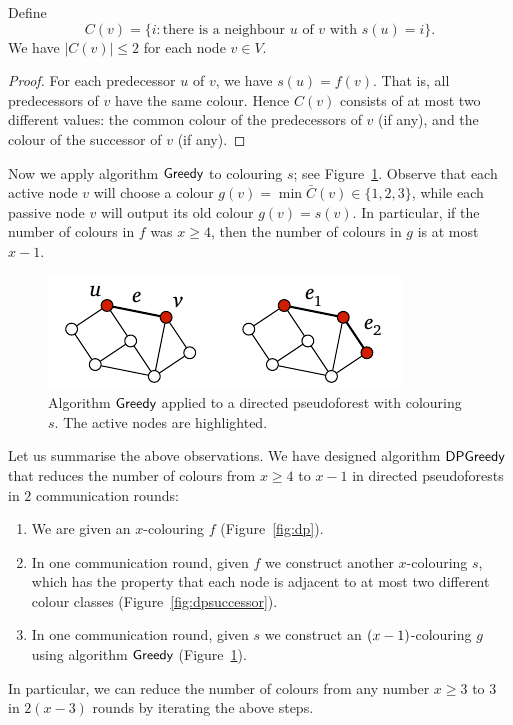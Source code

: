 \begin{lemma}
    Define
    \[
        C(v) = \{ i : \text{there is a neighbour $u$ of $v$ with $s(u) = i$} \}.
    \]
    We have $|C(v)| \le 2$ for each node $v \in V$.
\end{lemma}
\begin{proof}
    For each predecessor $u$ of $v$, we have $s(u) = f(v)$. That is, all predecessors of $v$ have the same colour. Hence $C(v)$ consists of at most two different values: the common colour of the predecessors of $v$ (if any), and the colour of the successor of $v$ (if any).
\end{proof}

Now we apply algorithm $\textsf{Greedy}$ to colouring $s$; see Figure~\ref{fig:dpgreedy}. Observe that each active node $v$ will choose a colour $g(v) = \min \bar{C}(v) \in \{1,2,3\}$, while each passive node $v$ will output its old colour $g(v) = s(v)$. In particular, if the number of colours in $f$ was $x \ge 4$, then the number of colours in $g$ is at most $x - 1$.

\begin{figure}
    \centering
    \includegraphics[page=\PDPGreedy]{figs.pdf}
    \caption{Algorithm $\textsf{Greedy}$ applied to a directed pseudoforest with colouring~$s$. The active nodes are highlighted.}\label{fig:dpgreedy}
\end{figure}

Let us summarise the above observations. We have designed algorithm $\textsf{DPGreedy}$ that reduces the number of colours from $x \ge 4$ to $x-1$ in directed pseudoforests in $2$ communication rounds:
\begin{enumerate}
    \item We are given an $x$-colouring $f$ (Figure~\ref{fig:dp}).
    \item In one communication round, given $f$ we construct another $x$-colouring $s$, which has the property that each node is adjacent to at most two different colour classes (Figure~\ref{fig:dpsuccessor}).
    \item In one communication round, given $s$ we construct an $(x-\nobreak 1)$-colouring $g$ using algorithm $\textsf{Greedy}$ (Figure~\ref{fig:dpgreedy}).
\end{enumerate}
In particular, we can reduce the number of colours from any number $x \ge 3$ to $3$ in ${2(x-3)}$ rounds by iterating the above steps.

